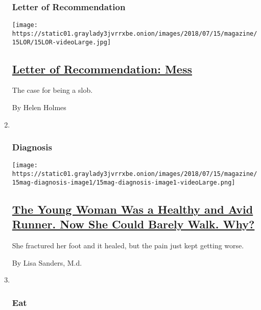 \begin{enumerate}
{  \subsubsection{Letter of
  Recommendation}\label{letter-of-recommendation}}

  \texttt{[image: https://static01.graylady3jvrrxbe.onion/images/2018/07/15/magazine/15LOR/15LOR-videoLarge.jpg]}

  \hypertarget{letter-of-recommendation-mess}{%
  \subsection{\texorpdfstring{\href{/2018/07/11/magazine/letter-of-recommendation-mess.html}{Letter
  of Recommendation:
  Mess}}{Letter of Recommendation: Mess}}\label{letter-of-recommendation-mess}}

  The case for being a slob.

  By Helen Holmes
\item ~
  \hypertarget{diagnosis}{%
  \subsubsection{Diagnosis}\label{diagnosis}}

  \texttt{[image: https://static01.graylady3jvrrxbe.onion/images/2018/07/15/magazine/15mag-diagnosis-image1/15mag-diagnosis-image1-videoLarge.png]}

  \hypertarget{the-young-woman-was-a-healthy-and-avid-runner-now-she-could-barely-walk-why}{%
  \subsection{\texorpdfstring{\href{/2018/07/11/magazine/the-young-woman-was-a-healthy-and-avid-runner-now-she-could-barely-walk-why.html}{The
  Young Woman Was a Healthy and Avid Runner. Now She Could Barely Walk.
  Why?}}{The Young Woman Was a Healthy and Avid Runner. Now She Could Barely Walk. Why?}}\label{the-young-woman-was-a-healthy-and-avid-runner-now-she-could-barely-walk-why}}

  She fractured her foot and it healed, but the pain just kept getting
  worse.

  By Lisa Sanders, M.d.
\item ~
  \hypertarget{eat}{%
  \subsubsection{Eat}\label{eat}}


\end{enumerate}
